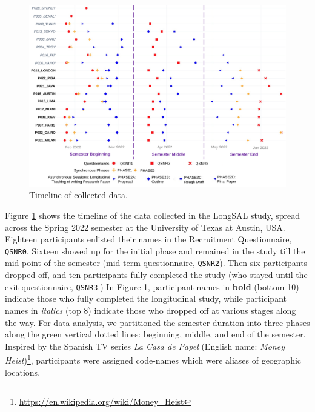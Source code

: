 \documentclass[letterpaper, nobind]{templates/ociamthesis}
\begin{document}
\begin{figure}

{\centering \includegraphics[width=1\linewidth]{figs/res-timeline-collected-data} 

}

\caption[Timeline of collected data.]{Timeline of collected data.}\label{fig:res-timeline-collected-data}
\end{figure}





Figure \ref{fig:res-timeline-collected-data} shows the timeline of the data collected in the LongSAL study, spread across the Spring 2022 semester at the University of Texas at Austin, USA.
Eighteen participants enlisted their names in the Recruitment Questionnaire, \texttt{QSNR0}.
Sixteen showed up for the initial phase and remained in the study till the mid-point of the semester (mid-term questionnaire, \texttt{QSNR2}).
Then six participants dropped off, and ten participants fully completed the study (who stayed until the exit questionnaire, \texttt{QSNR3}.)
In Figure \ref{fig:res-timeline-collected-data}, participant names in \textbf{bold} (bottom 10) indicate those who fully completed the longitudinal study,
while participant names in \emph{italics} (top 8) indicate those who dropped off at various stages along the way.
For data analysis, we partitioned the semester duration into three phases along the green vertical dotted lines: beginning, middle, and end of the semester.
Inspired by the Spanish TV series \emph{La Casa de Papel} (English name: \emph{Money Heist})\footnote{\url{https://en.wikipedia.org/wiki/Money_Heist}}, participants were assigned code-names which were aliases of geographic locations.
\end{document}
